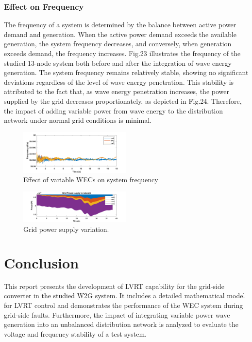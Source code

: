\documentclass[conference]{IEEEtran}
\begin{document}
\subsubsection{Effect on Frequency}
The frequency of a system is determined by the balance between active power demand and generation. When the active power demand exceeds the available generation, the system frequency decreases, and conversely, when generation exceeds demand, the frequency increases. Fig.23 illustrates the frequency of the studied 13-node system both before and after the integration of wave energy generation. The system frequency remains relatively stable, showing no significant deviations regardless of the level of wave energy penetration. This stability is attributed to the fact that, as wave energy penetration increases, the power supplied by the grid decreases proportionately, as depicted in Fig.24. Therefore, the impact of adding variable power from wave energy to the distribution network under normal grid conditions is minimal.
\begin{figure}[htbp]
    \centering
    \includegraphics[width=0.5\textwidth]{Figs/5_3_1/frequency.png}
    \caption{Effect of variable WECs on system frequency}
    \label{fig:W2G_normal_grid}
\end{figure}
\begin{figure}[h!]
    \centering
    \includegraphics[width=0.5\textwidth]{Figs/5_3_1/grid power.png}
    \caption{Grid power supply variation.}
    \label{fig:W2G_normal_grid}
\end{figure}

\section{Conclusion}

This report presents the development of LVRT capability for the grid-side converter in the studied W2G system. It includes a detailed mathematical model for LVRT control and demonstrates the performance of the WEC system during grid-side faults. Furthermore, the impact of integrating variable power wave generation into an unbalanced distribution network is analyzed to evaluate the voltage and frequency stability of a test system.
\end{document}
